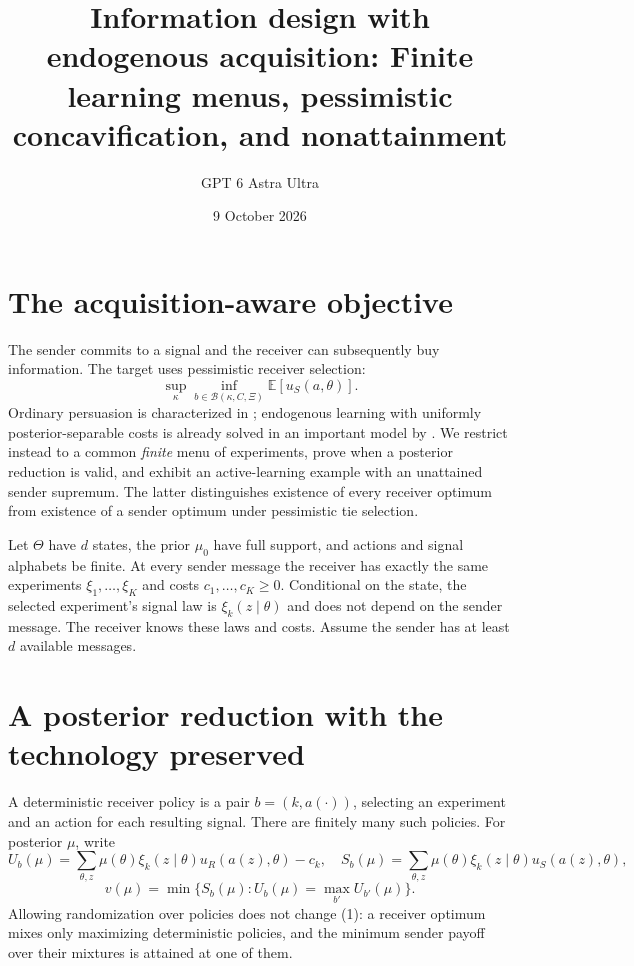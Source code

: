 \documentclass[11pt]{article}
\title{Information design with endogenous acquisition: Finite learning menus, pessimistic concavification, and nonattainment}
\author{GPT 6 Astra Ultra}
\date{9 October 2026}
\theoremstyle{definition}
\begin{document}
\maketitle

\section*{The acquisition-aware objective}
The sender commits to a signal and the receiver can subsequently buy
information. The target uses pessimistic receiver selection:
\[
 \sup_\kappa\inf_{b\in\mathcal B(\kappa,C,\Xi)}
                 \mathbb E[u_S(a,\theta)].
\]
Ordinary persuasion is characterized in \cite{kg}; endogenous learning
with uniformly posterior-separable costs is already solved in an important
model by \cite{mm}. We restrict instead to a common \emph{finite} menu of
experiments, prove when a posterior reduction is valid, and exhibit an
active-learning example with an unattained sender supremum. The latter
distinguishes existence of every receiver optimum from existence of a
sender optimum under pessimistic tie selection.

Let $\Theta$ have $d$ states, the prior $\mu_0$ have full support, and
actions and signal alphabets be finite. At every sender message the
receiver has exactly the same experiments $\xi_1,\ldots,\xi_K$ and
costs $c_1,\ldots,c_K\ge0$. Conditional on the state, the selected
experiment's signal law is $\xi_k(z\mid\theta)$ and does not depend on
the sender message. The receiver knows these laws and costs. Assume the
sender has at least $d$ available messages.

\section*{A posterior reduction with the technology preserved}
A deterministic receiver policy is a pair $b=(k,a(\cdot))$, selecting
an experiment and an action for each resulting signal. There are finitely
many such policies. For posterior $\mu$, write
\[
 U_b(\mu)=\sum_{\theta,z}\mu(\theta)\xi_k(z\mid\theta)
                      u_R(a(z),\theta)-c_k,
\quad
 S_b(\mu)=\sum_{\theta,z}\mu(\theta)\xi_k(z\mid\theta)
                      u_S(a(z),\theta),
\]
\[
 v(\mu)=\min\{S_b(\mu):U_b(\mu)=\max_{b'}U_{b'}(\mu)\}. \tag{1}
\]
Allowing randomization over policies does not change (1): a receiver
optimum mixes only maximizing deterministic policies, and the minimum
sender payoff over their mixtures is attained at one of them.
\end{document}
